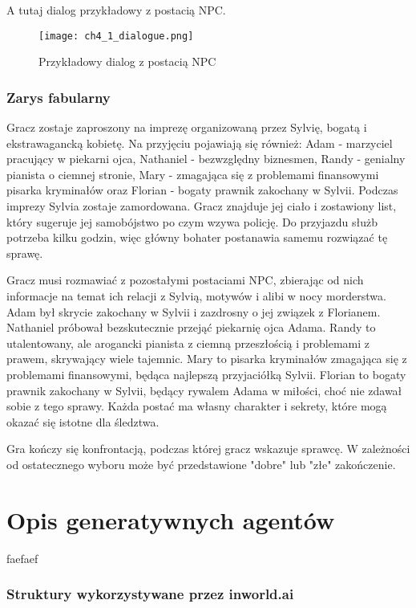 A tutaj dialog przykładowy z postacią NPC.

\begin{figure}[h!]
    \centering
    \texttt{[image: ch4\_1\_dialogue.png]}
    \caption{Przykładowy dialog z postacią NPC}
    \label{fig:ch4_1_dialogue}
\end{figure}

\subsubsection*{Zarys fabularny}

Gracz zostaje zaproszony na imprezę organizowaną przez Sylvię, bogatą i ekstrawagancką kobietę. Na 
przyjęciu pojawiają się również: Adam - marzyciel pracujący w piekarni ojca, Nathaniel - 
bezwzględny biznesmen, Randy - genialny pianista o ciemnej stronie, Mary - zmagająca się z 
problemami finansowymi pisarka kryminałów oraz Florian - bogaty prawnik zakochany w Sylvii. 
Podczas imprezy Sylvia zostaje zamordowana. Gracz znajduje jej ciało i zostawiony list, który 
sugeruje jej samobójstwo po czym wzywa policję. Do przyjazdu służb potrzeba kilku godzin, więc
główny bohater postanawia samemu rozwiązać tę sprawę. 

Gracz musi rozmawiać z pozostałymi postaciami NPC, zbierając od nich informacje na temat ich 
relacji z Sylvią, motywów i alibi w nocy morderstwa. Adam był skrycie zakochany w Sylvii i 
zazdrosny o jej związek z Florianem. Nathaniel próbował bezskutecznie przejąć piekarnię ojca Adama. 
Randy to utalentowany, ale arogancki pianista z ciemną przeszłością i problemami z prawem, 
skrywający wiele tajemnic. Mary to pisarka kryminałów zmagająca się z problemami finansowymi, 
będąca najlepszą przyjaciółką Sylvii. Florian to bogaty prawnik zakochany w Sylvii, będący rywalem 
Adama w miłości, choć nie zdawał sobie z tego sprawy. Każda postać ma własny charakter i sekrety, 
które mogą okazać się istotne dla śledztwa.

Gra kończy się konfrontacją, podczas której gracz wskazuje sprawcę. 
W zależności od ostatecznego wyboru może być przedstawione "dobre" lub "złe" zakończenie.

\section{Opis generatywnych agentów}\label{section:ch4_2}

faefaef

\subsubsection*{Struktury wykorzystywane przez inworld.ai}

